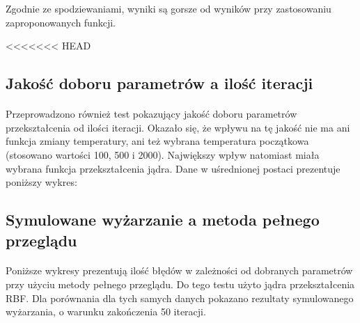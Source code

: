 \documentclass{article}
\begin{document}
Zgodnie ze spodziewaniami, wyniki są gorsze od wyników przy zastosowaniu zaproponowanych funkcji.

<<<<<<< HEAD
\subsection{Jakość doboru parametrów a ilość iteracji}
\paragraph{}
Przeprowadzono również test pokazujący jakość doboru parametrów przekształcenia od ilości iteracji. Okazało się, że wpływu na tę jakość nie ma ani funkcja zmiany temperatury, ani też wybrana temperatura początkowa (stosowano wartości 100, 500 i 2000). Największy wpływ natomiast miała wybrana funkcja przekształcenia jądra. Dane w uśrednionej postaci prezentuje poniższy wykres:

\pgfplotsset{width=7cm,compat=1.4}
\begin{center}
\end{center}

\subsection{Symulowane wyżarzanie a metoda pełnego przeglądu}
\paragraph{}
Poniższe wykresy prezentują ilość błędów w zależności od dobranych parametrów przy użyciu metody pełnego  przeglądu. Do tego testu użyto jądra przekształcenia RBF. Dla porównania dla tych samych danych pokazano rezultaty symulowanego wyżarzania, o warunku zakończenia 50 iteracji.
\end{document}
